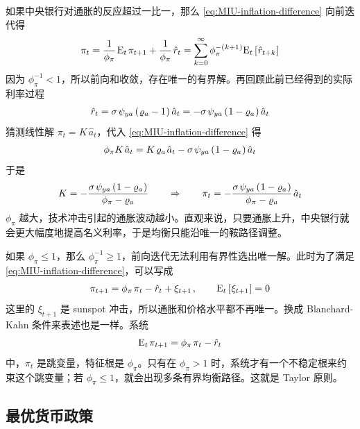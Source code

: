 \myskip
{}

如果中央银行对通胀的反应超过一比一，那么 \ref{eq:MIU-inflation-difference} 向前迭代得
\begin{align*}
    \pi_t
    =\dfrac{1}{\phi_\pi}\,\meant\,\pi\nt+\dfrac{1}{\phi_\pi}\,\hat r_t
    =\sum^\infty_{k=0}\phi_\pi^{-\bka{k+1}}\meant\bks{\hat r_{t+k}}
\end{align*}
因为 \(\phi_\pi^{-1}<1\)，所以前向和收敛，存在唯一的有界解。再回顾此前已经得到的实际利率过程
\begin{align*}
    \hat r_t=\sigma\,\psi_{ya}\bka{\varrho_a-1}\hat a_t=-\sigma\,\psi_{ya}\bka{1-\varrho_a}\hat a_t
\end{align*}
猜测线性解 \(\pi_t=K\,\hat a_t\)，代入 \ref{eq:MIU-inflation-difference} 得
\begin{align*}
    \phi_\pi K\,\hat a_t
    =K\,\varrho_a\,\hat a_t-\sigma\,\psi_{ya}\bka{1-\varrho_a}\hat a_t
\end{align*}
于是
\begin{align*}
    K=-\dfrac{\sigma\,\psi_{ya}\bka{1-\varrho_a}}{\phi_\pi-\varrho_a}
    \qquad\Rightarrow\qquad
    \pi_t=-\dfrac{\sigma\,\psi_{ya}\bka{1-\varrho_a}}{\phi_\pi-\varrho_a}\,\hat a_t
\end{align*}
\(\phi_\pi\) 越大，技术冲击引起的通胀波动越小。直观来说，只要通胀上升，中央银行就会更大幅度地提高名义利率，于是均衡只能沿唯一的鞍路径调整。

\myskip
{}

如果 \(\phi_\pi\le1\)，那么 \(\phi_\pi^{-1}\ge1\)，前向迭代无法利用有界性选出唯一解。此时为了满足 \ref{eq:MIU-inflation-difference}，可以写成
\begin{align*}
    \pi\nt=\phi_\pi\,\pi_t-\hat r_t+\xi_{t+1}\,,\qquad \meant\bks{\xi_{t+1}}=0
\end{align*}
这里的 \(\xi_{t+1}\) 是 sunspot 冲击，所以通胀和价格水平都不再唯一。换成 Blanchard-Kahn 条件来表述也是一样。系统
\begin{align*}
    \meant\,\pi\nt=\phi_\pi\,\pi_t-\hat r_t
\end{align*}
中，\(\pi_t\) 是跳变量，特征根是 \(\phi_\pi\)。只有在 \(\phi_\pi>1\) 时，系统才有一个不稳定根来约束这个跳变量；若 \(\phi_\pi\le1\)，就会出现多条有界均衡路径。这就是 Taylor 原则。

\subsection{最优货币政策}

